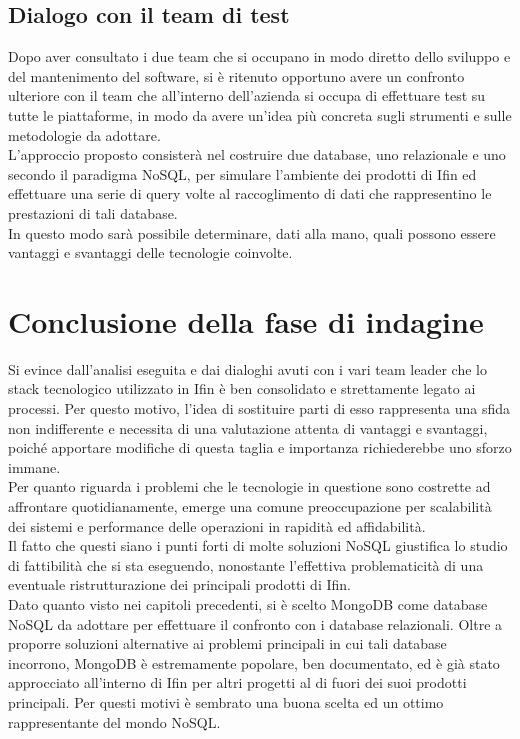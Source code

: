\subsection{Dialogo con il team di test}
Dopo aver consultato i due team che si occupano in modo diretto dello sviluppo e del mantenimento del software, si è ritenuto opportuno avere un confronto ulteriore con il team che all'interno dell'azienda si occupa di effettuare test su tutte le piattaforme, in modo da avere un'idea più concreta sugli strumenti e sulle metodologie da adottare.\\
L'approccio proposto consisterà nel costruire due database, uno relazionale e uno secondo il paradigma NoSQL, per simulare l'ambiente dei prodotti di Ifin ed effettuare una serie di query volte al raccoglimento di dati che rappresentino le prestazioni di tali database.\\
In questo modo sarà possibile determinare, dati alla mano, quali possono essere vantaggi e svantaggi delle tecnologie coinvolte.\\


\section{Conclusione della fase di indagine}

Si evince dall'analisi eseguita e dai dialoghi avuti con i vari team leader che lo stack tecnologico utilizzato in Ifin è ben consolidato e strettamente legato ai processi. Per questo motivo, l'idea di sostituire parti di esso rappresenta una sfida non indifferente e necessita di una valutazione attenta di vantaggi e svantaggi, poiché apportare modifiche di questa taglia e importanza richiederebbe uno sforzo immane.\\
Per quanto riguarda i problemi che le tecnologie in questione sono costrette ad affrontare quotidianamente, emerge una comune preoccupazione per scalabilità dei sistemi e performance delle operazioni in rapidità ed affidabilità.\\
Il fatto che questi siano i punti forti di molte soluzioni NoSQL giustifica lo studio di fattibilità che si sta eseguendo, nonostante l'effettiva problematicità di una eventuale ristrutturazione dei principali prodotti di Ifin.\\

\noindent Dato quanto visto nei capitoli precedenti, si è scelto MongoDB come database NoSQL da adottare per effettuare il confronto con i database relazionali. Oltre a proporre soluzioni alternative ai problemi principali in cui tali database incorrono, MongoDB è estremamente popolare, ben documentato, ed è già stato approcciato all'interno di Ifin per altri progetti al di fuori dei suoi prodotti principali. Per questi motivi è sembrato una buona scelta ed un ottimo rappresentante del mondo NoSQL.\\


